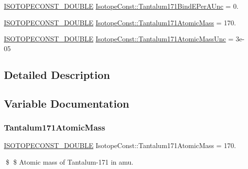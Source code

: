 \begin{DoxyCompactItemize}
\mbox{\hyperlink{group___isotope_const-_macros_ga8f45a7272ce02c0b4c65c44636ed719a}{I\+S\+O\+T\+O\+P\+E\+C\+O\+N\+S\+T\+\_\+\+D\+O\+U\+B\+LE}} \mbox{\hyperlink{group___isotope_const-_tantalum-_ta171_ga4e0e913b1476156e6235166861ada587}{Isotope\+Const\+::\+Tantalum171\+Bind\+E\+Per\+A\+Unc}} = 0.
\item 
\mbox{\hyperlink{group___isotope_const-_macros_ga8f45a7272ce02c0b4c65c44636ed719a}{I\+S\+O\+T\+O\+P\+E\+C\+O\+N\+S\+T\+\_\+\+D\+O\+U\+B\+LE}} \mbox{\hyperlink{group___isotope_const-_tantalum-_ta171_gac43452c3037c5d94fb83c934d24f2d86}{Isotope\+Const\+::\+Tantalum171\+Atomic\+Mass}} = 170.
\item 
\mbox{\hyperlink{group___isotope_const-_macros_ga8f45a7272ce02c0b4c65c44636ed719a}{I\+S\+O\+T\+O\+P\+E\+C\+O\+N\+S\+T\+\_\+\+D\+O\+U\+B\+LE}} \mbox{\hyperlink{group___isotope_const-_tantalum-_ta171_ga3ac9985c8de09d585ab5f111a223ee52}{Isotope\+Const\+::\+Tantalum171\+Atomic\+Mass\+Unc}} = 3e-\/05
\end{DoxyCompactItemize}


\subsection{Detailed Description}


\subsection{Variable Documentation}
\mbox{\label{group___isotope_const-_tantalum-_ta171_gac43452c3037c5d94fb83c934d24f2d86}} 
\subsubsection{\texorpdfstring{Tantalum171\+Atomic\+Mass}{Tantalum171AtomicMass}}
{\footnotesize\ttfamily \mbox{\hyperlink{group___isotope_const-_macros_ga8f45a7272ce02c0b4c65c44636ed719a}{I\+S\+O\+T\+O\+P\+E\+C\+O\+N\+S\+T\+\_\+\+D\+O\+U\+B\+LE}} Isotope\+Const\+::\+Tantalum171\+Atomic\+Mass = 170.}

\$ \$ Atomic mass of Tantalum-\/171 in amu. \mbox{\label{group___isotope_const-_tantalum-_ta171_ga3ac9985c8de09d585ab5f111a223ee52}} 
